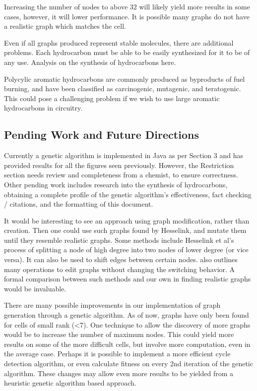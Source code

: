 \documentclass[12pt]{article}
\begin{document}
Increasing the number of nodes to above 32 will likely yield more results in some cases, however, it will lower performance. It is possible many graphs do not have a realistic graph which matches the cell.

Even if all graphs produced represent stable molecules, there are additional problems. Each hydrocarbon must be able to be easily synthesized for it to be of any use. Analysis on the synthesis of hydrocarbons here.

Polycylic aromatic hydrocarbons are commonly produced as byproducts of fuel burning, and have been classified as carcinogenic, mutagenic, and teratogenic. This could pose a challenging problem if we wish to use large aromatic hydrocarbons in circuitry. 

\subsection{Pending Work and Future Directions}
Currently a genetic algorithm is implemented in Java as per Section 3 and has provided results for all the figures seen previously. However, the Restriction section needs review and completeness from a chemist, to ensure correctness. Other pending work includes research into the synthesis of hydrocarbons, obtaining a complete profile of the genetic algorithm's effectiveness, fact checking / citations, and the formatting of this document.

It would be interesting to see an approach using graph modification, rather than creation. Then one could use such graphs found by Hesselink, and mutate them until they resemble realistic graphs. Some methods include Hesselink et al's \cite{HH13} process of splitting a node of high degree into two nodes of lower degree (or vice versa). It can also be used to shift edges between certain nodes. \cite{v06} also outlines many operations to edit graphs without changing the switching behavior. A formal comparison between such methods and our own in finding realistic graphs would be invaluable.

There are many possible improvements in our implementation of graph generation through a genetic algorithm. As of now, graphs have only been found for cells of small rank (\textless 7). One technique to allow the discovery of more graphs would be to increase the number of maximum nodes. This could yield more results on some of the more difficult cells, but involve more computation, even in the average case. Perhaps it is possible to implement a more efficient cycle detection algorithm, or even calculate fitness on every 2nd iteration of the genetic algorithm. These changes may allow even more results to be yielded from a heuristic genetic algorithm based approach.
\end{document}
